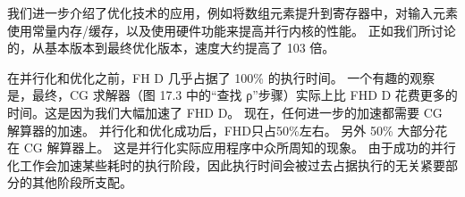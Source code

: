 我们进一步介绍了优化技术的应用，例如将数组元素提升到寄存器中，对输入元素使用常量内存/缓存，以及使用硬件功能来提高并行内核的性能。 正如我们所讨论的，从基本版本到最终优化版本，速度大约提高了 103 倍。

在并行化和优化之前，FH D 几乎占据了 100\% 的执行时间。 一个有趣的观察是，最终，CG 求解器（图 17.3 中的“查找 ρ”步骤）实际上比 FHD D 花费更多的时间。这是因为我们大幅加速了 FHD D。 现在，任何进一步的加速都需要 CG 解算器的加速。 并行化和优化成功后，FHD只占50\%左右。 另外 50\% 大部分花在 CG 解算器上。 这是并行化实际应用程序中众所周知的现象。 由于成功的并行化工作会加速某些耗时的执行阶段，因此执行时间会被过去占据执行的无关紧要部分的其他阶段所支配。




